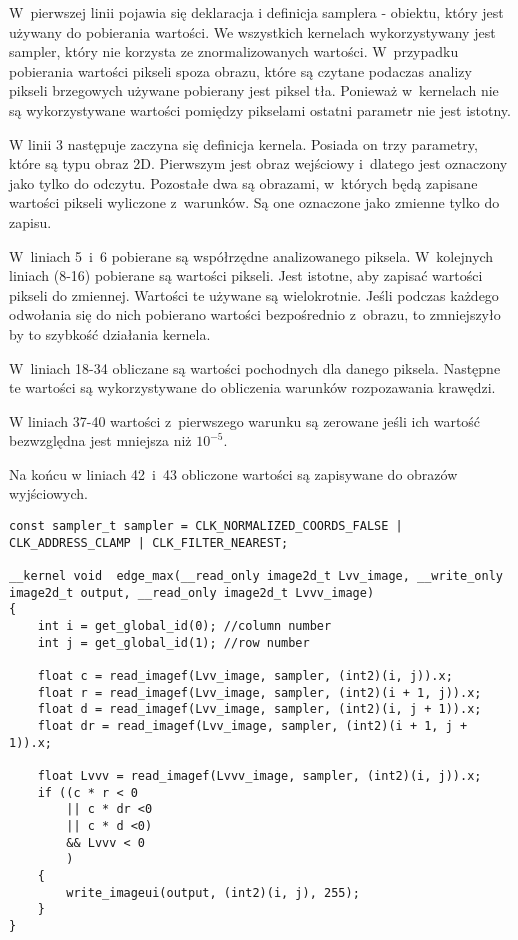 W~pierwszej linii pojawia się deklaracja i definicja samplera - obiektu, który jest używany do pobierania wartości. We wszystkich kernelach wykorzystywany jest sampler, który nie korzysta ze znormalizowanych wartości. W~przypadku pobierania wartości pikseli spoza obrazu, które są czytane podaczas analizy pikseli brzegowych używane pobierany jest piksel tła. Ponieważ w~kernelach nie są wykorzystywane wartości pomiędzy pikselami ostatni parametr nie jest istotny.

W linii 3 następuje zaczyna się definicja kernela. Posiada on trzy parametry, które są typu obraz 2D. Pierwszym jest obraz wejściowy i~dlatego jest oznaczony jako tylko do odczytu. Pozostałe dwa są obrazami, w~których będą zapisane wartości pikseli wyliczone z~warunków. Są one oznaczone jako zmienne tylko do zapisu.

W~liniach 5~i~6 pobierane są współrzędne analizowanego piksela. W~kolejnych liniach (8-16) pobierane są wartości pikseli. Jest istotne, aby zapisać wartości pikseli do zmiennej. Wartości te używane są wielokrotnie. Jeśli podczas każdego odwołania się do nich pobierano wartości bezpośrednio z~obrazu, to zmniejszyło by to szybkość działania kernela.

W~liniach 18-34 obliczane są wartości pochodnych dla danego piksela. Następne te wartości są wykorzystywane do  obliczenia warunków rozpozawania krawędzi.

W liniach 37-40 wartości z~pierwszego warunku są zerowane jeśli ich wartość bezwzględna jest mniejsza niż $  10^{-5} $.

Na końcu w liniach 42~i~43 obliczone wartości są zapisywane do obrazów wyjściowych.

\begin{lstlisting}
const sampler_t sampler = CLK_NORMALIZED_COORDS_FALSE | CLK_ADDRESS_CLAMP | CLK_FILTER_NEAREST;

__kernel void  edge_max(__read_only image2d_t Lvv_image, __write_only image2d_t output, __read_only image2d_t Lvvv_image)
{
	int i = get_global_id(0); //column number
	int j = get_global_id(1); //row number

	float c = read_imagef(Lvv_image, sampler, (int2)(i, j)).x;
	float r = read_imagef(Lvv_image, sampler, (int2)(i + 1, j)).x;
	float d = read_imagef(Lvv_image, sampler, (int2)(i, j + 1)).x;
	float dr = read_imagef(Lvv_image, sampler, (int2)(i + 1, j + 1)).x;
	
	float Lvvv = read_imagef(Lvvv_image, sampler, (int2)(i, j)).x;
	if ((c * r < 0 
		|| c * dr <0
		|| c * d <0)
		&& Lvvv < 0
		)
	{
		write_imageui(output, (int2)(i, j), 255);
	}
}
\end{lstlisting}

